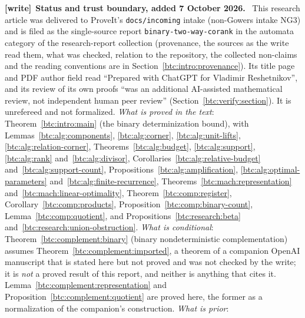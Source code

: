 \documentclass[11pt,letterpaper]{article}
\theoremstyle{definition}
\newcommand{\file}[1]{\nolinkurl{#1}}
\newenvironment{writenote}[1][]{\par\smallskip\begingroup\small
 \noindent\textbf{[write]}\if\relax\detokenize{#1}\relax\else~\textbf{#1.}\fi\ }%
 {\par\endgroup\smallskip}
\begin{document}
\begin{titlepage}
\begin{abstract}
All arguments for the determinization theorem are given here.
Exact finite audits accompany the proofs; they are diagnostic evidence,
not a replacement for proof or a Lean formalization. Attribution,
source versions, limitations of novelty claims, and a focused research
agenda are included.
\end{abstract}
\end{titlepage}
\hypersetup{pageanchor=true}
\begin{writenote}[Status and trust boundary, added 7 October 2026]
This research article was delivered to ProveIt's \file{docs/incoming}
intake (non-Gowers intake NG3) and is filed as the single-source report
\file{binary-two-way-corank} in the automata category of the research-report
collection (provenance, the sources as the write read them, what was
checked, relation to the repository, the collected non-claims and the
reading conventions are in Section~\ref{btc:intro:provenance}). Its title
page and PDF author field read ``Prepared with ChatGPT for Vladimir
Reshetnikov'', and its review of its own proofs ``was an additional
AI-assisted mathematical review, not independent human peer review''
(Section~\ref{btc:verify:section}). It is unrefereed and not formalized.
\emph{What is proved in the text}: Theorem~\ref{btc:intro:main} (the binary
determinization bound), with Lemmas~\ref{btc:alg:components},
\ref{btc:alg:corner}, \ref{btc:alg:unit-lifts},
\ref{btc:alg:relation-corner}, Theorems~\ref{btc:alg:budget},
\ref{btc:alg:support}, \ref{btc:alg:rank} and~\ref{btc:alg:divisor},
Corollaries~\ref{btc:alg:relative-budget} and~\ref{btc:alg:support-count},
Propositions~\ref{btc:alg:amplification}, \ref{btc:alg:optimal-parameters}
and~\ref{btc:alg:finite-recurrence}, Theorems~\ref{btc:mach:representation}
and~\ref{btc:mach:linear-optimality}, Theorem~\ref{btc:comp:register},
Corollary~\ref{btc:comp:products}, Proposition~\ref{btc:comp:binary-count},
Lemma~\ref{btc:comp:quotient}, and Propositions~\ref{btc:research:beta}
and~\ref{btc:research:union-obstruction}. \emph{What is conditional}:
Theorem~\ref{btc:complement:binary} (binary nondeterministic
complementation) assumes Theorem~\ref{btc:complement:imported}, a theorem of
a companion OpenAI manuscript that is stated here but not proved and was not
checked by the write; it is \emph{not} a proved result of this report, and
neither is anything that cites it. Lemma~\ref{btc:complement:representation}
and Proposition~\ref{btc:complement:quotient} are proved here, the former
as a normalization of the companion's construction. \emph{What is prior}:

\end{writenote}
\end{document}
